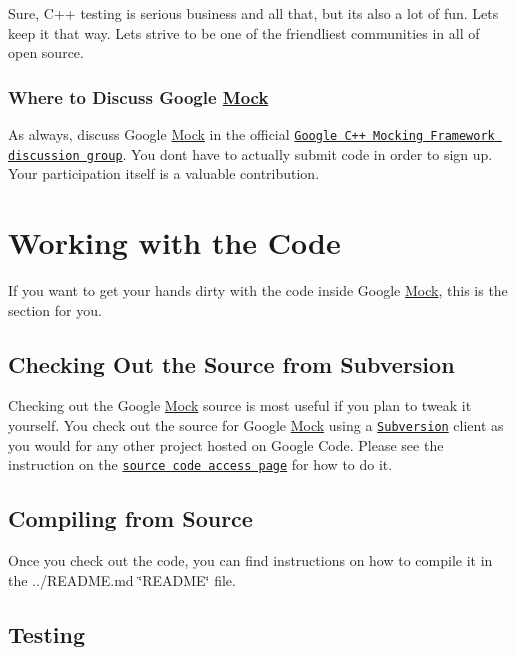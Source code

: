 Sure, C++ testing is serious business and all that, but it\textquotesingle{}s also a lot of fun. Let\textquotesingle{}s keep it that way. Let\textquotesingle{}s strive to be one of the friendliest communities in all of open source.

\subsubsection*{Where to Discuss Google \hyperlink{classMock}{Mock}}

As always, discuss Google \hyperlink{classMock}{Mock} in the official \href{http://groups.google.com/group/googlemock}{\tt Google C++ Mocking Framework discussion group}. You don\textquotesingle{}t have to actually submit code in order to sign up. Your participation itself is a valuable contribution.

\section*{Working with the Code}

If you want to get your hands dirty with the code inside Google \hyperlink{classMock}{Mock}, this is the section for you.

\subsection*{Checking Out the Source from Subversion}

Checking out the Google \hyperlink{classMock}{Mock} source is most useful if you plan to tweak it yourself. You check out the source for Google \hyperlink{classMock}{Mock} using a \href{http://subversion.tigris.org/}{\tt Subversion} client as you would for any other project hosted on Google Code. Please see the instruction on the \href{../}{\tt source code access page} for how to do it.

\subsection*{Compiling from Source}

Once you check out the code, you can find instructions on how to compile it in the ../\+R\+E\+A\+D\+ME.md \char`\"{}\+R\+E\+A\+D\+M\+E\char`\"{} file.

\subsection*{Testing}

